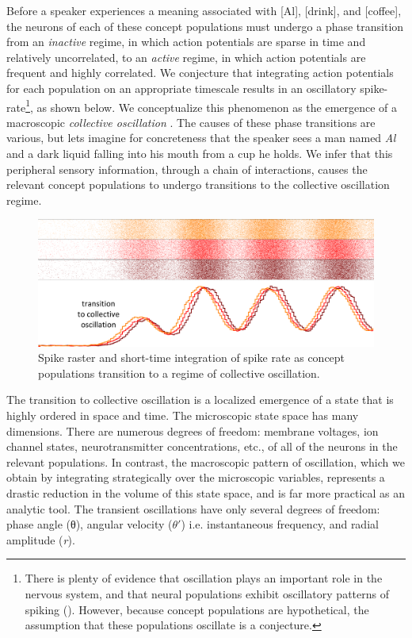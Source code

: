 Before a speaker experiences a meaning associated with [Al], [drink], and [coffee], the neurons of each of these concept populations must undergo a phase transition from an \textit{inactive} regime, in which action potentials are sparse in time and relatively uncorrelated, to an \textit{active} regime, in which action potentials are frequent and highly correlated. We conjecture that integrating action potentials for each population on an appropriate timescale results in an oscillatory spike-rate\footnote{There is plenty of evidence that oscillation plays an important role in the nervous system, and that neural populations exhibit oscillatory patterns of spiking (\citealt{AverbeckEtAl2003,Buzsaki2006,BuzsákiDraguhn2004,CanoltyKnight2010,EngelEtAl2001,Fuster2001,GerstnerKistler2002,Izhikevich2006,Izhikevich2007,IzhikevichEdelman2008,Klimesch1999}). However, because concept populations are hypothetical, the assumption that these populations oscillate is a conjecture.}, as shown below. We conceptualize this phenomenon as the emergence of a macroscopic \textit{collective oscillation} \citep{AcebrónEtAl2005,BreakspearEtAl2010,HongStrogatz2011,Kelso1997,SchonerKelso1988,Strogatz2000,Winfree2001}. The causes of these phase transitions are various, but lets imagine for concreteness that the speaker sees a man named \textit{Al} and a dark liquid falling into his mouth from a cup he holds. We infer that this peripheral sensory information, through a chain of interactions, causes the relevant concept populations to undergo transitions to the collective oscillation regime.


  
\begin{figure}
\includegraphics[width=\textwidth]{figures/Tilsen-img10.png}
\caption{Spike raster and short-time integration of spike rate as concept populations transition to a regime of collective oscillation.}
\label{fig:2:3}
\end{figure}
 

  The transition to collective oscillation is a localized emergence of a state that is highly ordered in space and time. The microscopic state space has many dimensions. There are numerous degrees of freedom: membrane voltages, ion channel states, neurotransmitter concentrations, etc., of all of the neurons in the relevant populations. In contrast, the macroscopic pattern of oscillation, which we obtain by integrating strategically over the microscopic variables, represents a drastic reduction in the volume of this state space, and is far more practical as an analytic tool. The transient oscillations have only several degrees of freedom: phase angle (θ), angular velocity ($\theta ′$) i.e. instantaneous frequency, and radial amplitude (\textit{r}).

